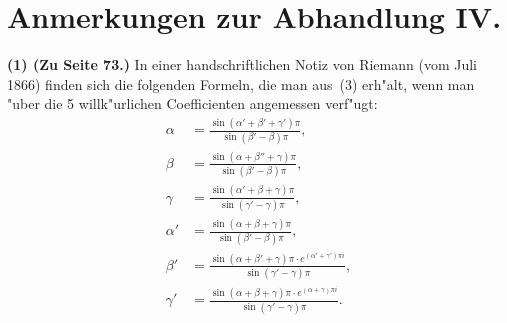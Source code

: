 \documentclass[12pt,a4paper]{article}
\begin{document}
\section*{Anmerkungen zur Abhandlung IV.}
\label{sec:anmerkungen}

\textbf{(1) (Zu Seite 73.)} In einer handschriftlichen Notiz von Riemann
(vom Juli 1866) finden sich die folgenden Formeln, die man aus~(3) erh"alt,
wenn man "uber die 5 willk"urlichen Coefficienten angemessen verf"ugt:
\[
\begin{aligned}
\alpha &= \frac{\sin(\alpha'+\beta'+\gamma')\pi}{\sin(\beta'-\beta)\pi},\\
\beta &= \frac{\sin(\alpha+\beta''+\gamma)\pi}{\sin(\beta'-\beta)\pi},\\
\gamma &= \frac{\sin(\alpha'+\beta+\gamma)\pi}{\sin(\gamma'-\gamma)\pi},\\
\alpha' &= \frac{\sin(\alpha+\beta+\gamma)\pi}{\sin(\beta'-\beta)\pi},\\
\beta' &= \frac{\sin(\alpha+\beta'+\gamma)\pi \cdot e^{(\alpha'+\gamma')\pi i}}{\sin(\gamma'-\gamma)\pi},\\
\gamma' &= \frac{\sin(\alpha+\beta+\gamma)\pi \cdot e^{(\alpha+\gamma)\pi i}}{\sin(\gamma'-\gamma)\pi}.
\end{aligned}
\]
\end{document}
